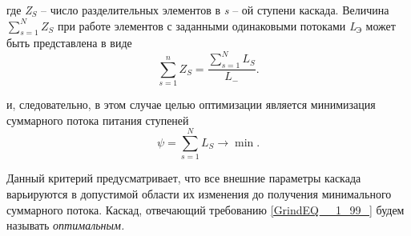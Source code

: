 где \textit{Z${}_{S}$} -- число разделительных элементов в \textit{s} -- ой ступени каскада. Величина $\sum _{s=1}^{N}Z_{S}  $ при работе элементов с заданными одинаковыми потоками \textit{L${}_{\textrm{Э}}$} может быть представлена в виде
\begin{equation} \label{GrindEQ__1_98_} 
\sum _{s=1}^{n}Z_{S} =\frac{\sum _{s=1}^{N}L_{S}  }{L_{-} }  .    
\end{equation} 

и, следовательно, в этом случае целью оптимизации является минимизация суммарного потока питания ступеней
\begin{equation} \label{GrindEQ__1_99_} 
\psi =\sum _{s=1}^{N}L_{S}  \to \min .    
\end{equation} 

Данный критерий предусматривает, что все внешние параметры каскада варьируются в допустимой области их изменения до получения минимального суммарного потока. Каскад, отвечающий требованию \ref{GrindEQ__1_99_} будем называть \textit{оптимальным.}







